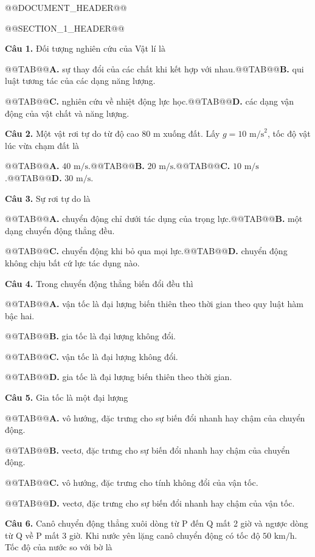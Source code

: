 \documentclass[11pt,a4paper]{article}
\begin{document}
@@DOCUMENT_HEADER@@

@@SECTION_1_HEADER@@

\textbf{Câu 1.} Đối tượng nghiên cứu của Vật lí là

@@TAB@@\textbf{A.} sự thay đổi của các chất khi kết hợp với nhau.@@TAB@@\textbf{B.} qui luật tương tác của các dạng năng lượng.

@@TAB@@\textbf{C.} nghiên cứu về nhiệt động lực học.@@TAB@@\textbf{D.} các dạng vận động của vật chất và năng lượng.

\textbf{Câu 2.} Một vật rơi tự do từ độ cao $80\text{ m}$ xuống đất. Lấy $g = 10\text{ m/s}^2$, tốc độ vật lúc vừa chạm đất là

@@TAB@@\textbf{A.} $40\text{ m/s}$.@@TAB@@\textbf{B.} $20\text{ m/s}$.@@TAB@@\textbf{C.} $10\text{ m/s}$.@@TAB@@\textbf{D.} $30\text{ m/s}$.

\textbf{Câu 3.} Sự rơi tự do là

@@TAB@@\textbf{A.} chuyển động chỉ dưới tác dụng của trọng lực.@@TAB@@\textbf{B.} một dạng chuyển động thẳng đều.

@@TAB@@\textbf{C.} chuyển động khi bỏ qua mọi lực.@@TAB@@\textbf{D.} chuyển động không chịu bất cứ lực tác dụng nào.

\textbf{Câu 4.} Trong chuyển động thẳng biến đổi đều thì

@@TAB@@\textbf{A.} vận tốc là đại lượng biến thiên theo thời gian theo quy luật hàm bậc hai.

@@TAB@@\textbf{B.} gia tốc là đại lượng không đổi.

@@TAB@@\textbf{C.} vận tốc là đại lượng không đổi.

@@TAB@@\textbf{D.} gia tốc là đại lượng biến thiên theo thời gian.

\textbf{Câu 5.} Gia tốc là một đại lượng

@@TAB@@\textbf{A.} vô hướng, đặc trưng cho sự biến đổi nhanh hay chậm của chuyển động.

@@TAB@@\textbf{B.} vectơ, đặc trưng cho sự biến đổi nhanh hay chậm của chuyển động.

@@TAB@@\textbf{C.} vô hướng, đặc trưng cho tính không đổi của vận tốc.

@@TAB@@\textbf{D.} vectơ, đặc trưng cho sự biến đổi nhanh hay chậm của vận tốc.

\textbf{Câu 6.} Canô chuyển động thẳng xuôi dòng từ P đến Q mất 2 giờ và ngược dòng từ Q về P mất 3 giờ. Khi nước yên lặng canô chuyển động có tốc độ $50\text{ km/h}$. Tốc độ của nước so với bờ là
\end{document}
